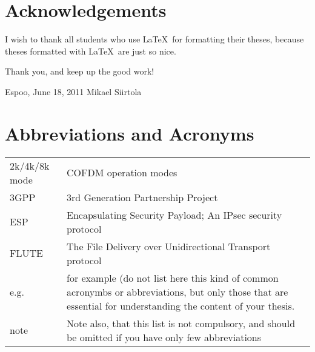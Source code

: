 \documentclass[12pt,a4paper,oneside,pdftex]{report}
\newcommand{\DATE}{June 18, 2011}
\newcommand{\AUTHOR}{Mikael Siirtola}
\begin{document}



\chapter*{Acknowledgements}

I wish to thank all students who use \LaTeX\ for formatting their theses,
because theses formatted with \LaTeX\ are just so nice.

Thank you, and keep up the good work!
\vskip 10mm

\noindent Espoo, \DATE
\vskip 5mm
\noindent\AUTHOR

\cleardoublepage
% 

\chapter*{Abbreviations and Acronyms}


\noindent
\begin{longtable}{@{}p{}p{}@{}}
2k/4k/8k mode & COFDM operation modes \\
3GPP & 3rd Generation Partnership Project \\
ESP & Encapsulating Security Payload; An IPsec security protocol \\
FLUTE & The File Delivery over Unidirectional Transport protocol \\
e.g.& for example (do not list here this kind of common acronymbs or abbreviations, but only those that are essential for understanding the content of your thesis. \\
note & Note also, that this list is not compulsory, and should be omitted if you have only few abbreviations

\end{longtable}
\end{document}
